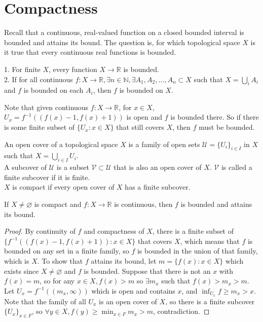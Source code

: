 \section{Compactness}
Recall that a continuous, real-valued function on a closed bounded interval is bounded and attains its bound.
The question is, for which topological space $X$ is it true that every continuous real functions is bounded.
\begin{example}
    1. For finite $X$, every function $X\to\mathbb R$ is bounded.\\
    2. If for all continuous $f:X\to\mathbb R,\exists n\in\mathbb N,\exists A_1,A_2,\ldots,A_n\subset X$ such that $X=\bigcup_iA_i$ and $f$ is bounded on each $A_i$, then $f$ is bounded on $X$.
\end{example}
Note that given continuous $f:X\to\mathbb R$, for $x\in X$, $U_x=f^{-1}((f(x)-1,f(x)+1))$ is open and $f$ is bounded there.
So if there is some finite subset of $\{U_x:x\in X\}$ that still covers $X$, then $f$ must be bounded.
\begin{definition}
    An open cover of a topological space $X$ is a family of open sets $\mathscr U=\{U_i\}_{i\in I}$ in $X$ such that $X=\bigcup_{i\in I}U_i$.\\
    A subcover of $\mathscr U$ is a subset $\mathscr V\subset \mathscr U$ that is also an open cover of $X$.
    $\mathscr V$ is called a finite subcover if it is finite.\\
    $X$ is compact if every open cover of $X$ has a finite subcover.
\end{definition}
\begin{theorem}
    If $X\neq\varnothing$ is compact and $f:X\to\mathbb R$ is continuous, then $f$ is bounded and attains its bound.
\end{theorem}
\begin{proof}
    By continuity of $f$ and compactness of $X$, there is a finite subset of $\{f^{-1}((f(x)-1,f(x)+1)):x\in X\}$ that covers $X$, which means that $f$ is bounded on any set in a finite family, so $f$ is bounded in the union of that family, which is $X$.
    To show that $f$ attains its bound, let $m=\{f(x):x\in X\}$ which exists since $X\neq\varnothing$ and $f$ is bounded.
    Suppose that there is not an $x$ with $f(x)=m$, so for any $x\in X,f(x)>m$ so $\exists m_x$ such that $f(x)>m_x>m$.
    Let $U_x=f^{-1}((m_x,\infty))$ which is open and contains $x$, and $\inf_{U_x}f\ge m_x>x$.
    Note that the family of all $U_x$ is an open cover of $X$, so there is a finite subcover $\{U_x\}_{x\in F}$, so $\forall y\in X,f(y)\ge \min_{x\in F}m_x>m$, contradiction.
\end{proof}
